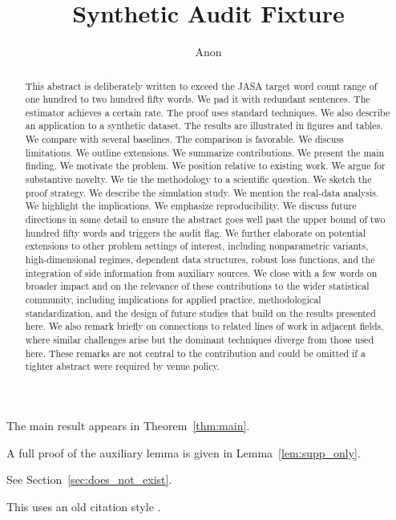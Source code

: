 \documentclass[11pt]{article}    %
\title{Synthetic Audit Fixture}
\author{Anon}
\date{}
\begin{document}
\maketitle

\begin{abstract}
This abstract is deliberately written to exceed the JASA target word count
range of one hundred to two hundred fifty words. We pad it with redundant
sentences. The estimator achieves a certain rate. The proof uses standard
techniques. We also describe an application to a synthetic dataset. The
results are illustrated in figures and tables. We compare with several
baselines. The comparison is favorable. We discuss limitations. We outline
extensions. We summarize contributions. We present the main finding. We
motivate the problem. We position relative to existing work. We argue for
substantive novelty. We tie the methodology to a scientific question. We
sketch the proof strategy. We describe the simulation study. We mention
the real-data analysis. We highlight the implications. We emphasize
reproducibility. We discuss future directions in some detail to ensure
the abstract goes well past the upper bound of two hundred fifty words
and triggers the audit flag. We further elaborate on potential extensions
to other problem settings of interest, including nonparametric variants,
high-dimensional regimes, dependent data structures, robust loss
functions, and the integration of side information from auxiliary
sources. We close with a few words on broader impact and on the relevance
of these contributions to the wider statistical community, including
implications for applied practice, methodological standardization,
and the design of future studies that build on the results presented
here. We also remark briefly on connections to related lines of work
in adjacent fields, where similar challenges arise but the dominant
techniques diverge from those used here. These remarks are not central
to the contribution and could be omitted if a tighter abstract were
required by venue policy.
\end{abstract}



The main result appears in Theorem~\ref{thm:main}.

A full proof of the auxiliary lemma is given in Lemma~\ref{lem:supp_only}.

See Section~\ref{sec:does_not_exist}.

This uses an old citation style \cite{smith2020}.



\end{document}

